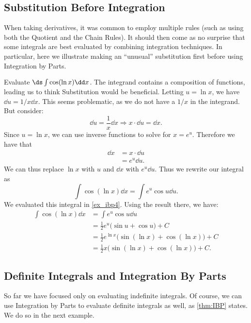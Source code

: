 \subsection{Substitution Before Integration}

When taking derivatives, it was common to employ multiple rules (such as using both the Quotient and the Chain Rules). It should then come as no surprise that some integrals are best evaluated by combining integration techniques. In particular, here we illustrate making an ``unusual'' substitution first before using Integration by Parts.

\begin{example}\label{ex_ibp8}%
Evaluate $\ds \int \cos(\ln x)\dd x$.
\solution
The integrand contains a composition of functions, leading us to think Substitution would be beneficial. Letting $u=\ln x$, we have $\dd u = 1/x\dd x$. This seems problematic, as we do not have a $1/x$ in the integrand. But consider:
\[\dd u = \frac 1x\dd x \Rightarrow x\cdot\dd u = \dd x.\]
Since $u = \ln x$, we can use inverse functions to solve for $x = e^u$. Therefore we have that
\begin{align*}
\dd x &= x\cdot \dd u \\
		&= e^u\dd u.
\end{align*}
We can thus replace $\ln x$ with $u$ and $\dd x$ with $e^u\dd u$. Thus we rewrite our integral as 
\[\int \cos(\ln x)\dd x = \int e^u\cos u\dd u.\]
We evaluated this integral in \autoref{ex_ibp4}. Using the result there, we have:
\begin{align*}
\int \cos(\ln x)\dd x &= \int e^u\cos u\dd u \\
				&= \frac12e^u\bigl(\sin u + \cos u\bigr) + C \\
				&= \frac12e^{\ln x} \bigl(\sin(\ln x) + \cos (\ln x)\bigr)+C\\
				&= \frac12x \bigl(\sin(\ln x) + \cos (\ln x)\bigr)+C.
\end{align*}
\end{example}

\subsection{Definite Integrals and Integration By Parts}

So far we have focused only on evaluating indefinite integrals. Of course, we can use Integration by Parts to evaluate definite integrals as well, as \autoref{thm:IBP} states. We do so in the next example.

